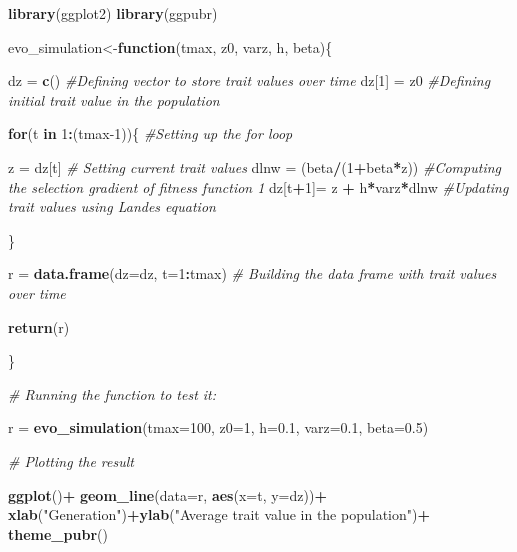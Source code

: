 \documentclass[
]{book}
\newenvironment{Shaded}{\begin{snugshade}}{\end{snugshade}}
\newcommand{\AttributeTok}[1]{\textcolor[rgb]{0.13,0.29,0.53}{#1}}
\newcommand{\CommentTok}[1]{\textcolor[rgb]{0.56,0.35,0.01}{\textit{#1}}}
\newcommand{\ControlFlowTok}[1]{\textcolor[rgb]{0.13,0.29,0.53}{\textbf{#1}}}
\newcommand{\DecValTok}[1]{\textcolor[rgb]{0.00,0.00,0.81}{#1}}
\newcommand{\FloatTok}[1]{\textcolor[rgb]{0.00,0.00,0.81}{#1}}
\newcommand{\FunctionTok}[1]{\textcolor[rgb]{0.13,0.29,0.53}{\textbf{#1}}}
\newcommand{\NormalTok}[1]{#1}
\newcommand{\OtherTok}[1]{\textcolor[rgb]{0.56,0.35,0.01}{#1}}
\newcommand{\SpecialCharTok}[1]{\textcolor[rgb]{0.81,0.36,0.00}{\textbf{#1}}}
\newcommand{\StringTok}[1]{\textcolor[rgb]{0.31,0.60,0.02}{#1}}
\begin{document}
\begin{Shaded}
\begin{Highlighting}[]
\FunctionTok{library}\NormalTok{(ggplot2)}
\FunctionTok{library}\NormalTok{(ggpubr)}

\NormalTok{evo\_simulation}\OtherTok{\textless{}{-}}\ControlFlowTok{function}\NormalTok{(tmax, z0, varz, h, beta)\{}

\NormalTok{dz }\OtherTok{=} \FunctionTok{c}\NormalTok{() }\CommentTok{\#Defining vector to store trait values over time}
\NormalTok{dz[}\DecValTok{1}\NormalTok{] }\OtherTok{=}\NormalTok{ z0 }\CommentTok{\#Defining initial trait value in the population}

\ControlFlowTok{for}\NormalTok{(t }\ControlFlowTok{in} \DecValTok{1}\SpecialCharTok{:}\NormalTok{(tmax}\DecValTok{{-}1}\NormalTok{))\{ }\CommentTok{\#Setting up the for loop}
  
\NormalTok{  z }\OtherTok{=}\NormalTok{ dz[t] }\CommentTok{\# Setting current trait values}
\NormalTok{  dlnw }\OtherTok{=}\NormalTok{ (beta}\SpecialCharTok{/}\NormalTok{(}\DecValTok{1}\SpecialCharTok{+}\NormalTok{beta}\SpecialCharTok{*}\NormalTok{z))  }\CommentTok{\#Computing the selection gradient of fitness function 1}
\NormalTok{  dz[t}\SpecialCharTok{+}\DecValTok{1}\NormalTok{]}\OtherTok{=}\NormalTok{ z }\SpecialCharTok{+}\NormalTok{ h}\SpecialCharTok{*}\NormalTok{varz}\SpecialCharTok{*}\NormalTok{dlnw }\CommentTok{\#Updating trait values using Lande\textquotesingle{}s equation}
  
\NormalTok{\}}

\NormalTok{r }\OtherTok{=} \FunctionTok{data.frame}\NormalTok{(}\AttributeTok{dz=}\NormalTok{dz, }\AttributeTok{t=}\DecValTok{1}\SpecialCharTok{:}\NormalTok{tmax) }\CommentTok{\# Building the data frame with trait values over time}
  
\FunctionTok{return}\NormalTok{(r)}

\NormalTok{\}}

\CommentTok{\# Running the function to test it:}

\NormalTok{r }\OtherTok{=} \FunctionTok{evo\_simulation}\NormalTok{(}\AttributeTok{tmax=}\DecValTok{100}\NormalTok{, }\AttributeTok{z0=}\DecValTok{1}\NormalTok{, }\AttributeTok{h=}\FloatTok{0.1}\NormalTok{, }\AttributeTok{varz=}\FloatTok{0.1}\NormalTok{, }\AttributeTok{beta=}\FloatTok{0.5}\NormalTok{)}

\CommentTok{\# Plotting the result}

\FunctionTok{ggplot}\NormalTok{()}\SpecialCharTok{+}
  \FunctionTok{geom\_line}\NormalTok{(}\AttributeTok{data=}\NormalTok{r, }\FunctionTok{aes}\NormalTok{(}\AttributeTok{x=}\NormalTok{t, }\AttributeTok{y=}\NormalTok{dz))}\SpecialCharTok{+}
  \FunctionTok{xlab}\NormalTok{(}\StringTok{"Generation"}\NormalTok{)}\SpecialCharTok{+}\FunctionTok{ylab}\NormalTok{(}\StringTok{"Average trait value in the population"}\NormalTok{)}\SpecialCharTok{+}
  \FunctionTok{theme\_pubr}\NormalTok{()}
\end{Highlighting}
\end{Shaded}
\end{document}

